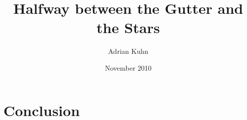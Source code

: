 \documentclass[10pt]{book}
\title{Halfway between the Gutter and the Stars}
\author{Adrian Kuhn}
\date{November 2010}
\begin{document}
\maketitle

\setcounter{tocdepth}{1}
\tableofcontents


\chapter{Conclusion}
\label{the conclusion}



\end{document}
